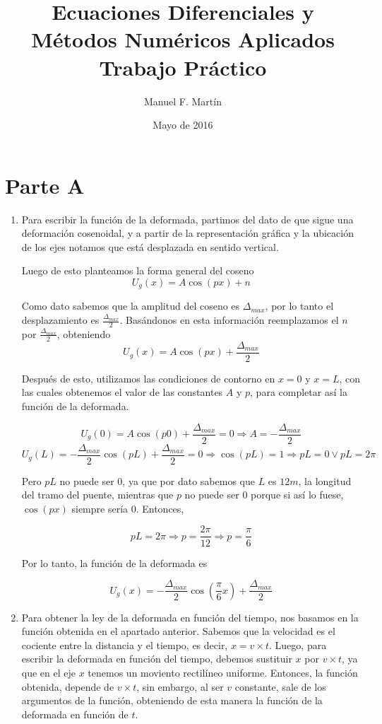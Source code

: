 \documentclass[10pt]{article}
\begin{document}
\date{Mayo de 2016}
\title{Ecuaciones Diferenciales y\\Métodos Numéricos Aplicados\\Trabajo Práctico}
\author{Manuel F. Martín}

\maketitle


\section*{Parte A}

\begin{enumerate}
 
 \item Para escribir la función de la deformada, partimos del dato de que sigue una deformación cosenoidal,
y a partir de la representación gráfica y la ubicación de los ejes notamos que está desplazada en sentido vertical.

Luego de esto planteamos la forma general del coseno \[U_g(x) = A \cos (px) + n\]

Como dato sabemos que la amplitud del coseno es
$\Delta_{max}$, por lo tanto el desplazamiento es $\frac{\Delta_{max}}{2}$. Basándonos en esta información reemplazamos el $n$ por
$\frac{\Delta_{max}}{2}$, obteniendo \[U_g(x) = A \cos (px) + \frac{\Delta_{max}}{2}\]

Después de esto, utilizamos las condiciones de contorno en $x = 0$ y $ x = L$, con las cuales obtenemos el valor de las constantes
$A$ y $p$, para completar así la función de la deformada.

\[U_g(0) = A \cos (p0) + \frac{\Delta_{max}}{2} = 0 \Rightarrow A = -\frac{\Delta_{max}}{2}\]
\[U_g(L) = -\frac{\Delta_{max}}{2} \cos (pL) + \frac{\Delta_{max}}{2} = 0 \Rightarrow \cos (pL) = 1 \Rightarrow pL = 0 \vee pL = 2\pi\]

Pero $pL$ no puede ser $0$, ya que por dato sabemos que $L$ es $12m$, la longitud del tramo del puente,
mientras que $p$ no puede ser $0$ porque si así lo fuese, $\cos(px)$ siempre sería $0$. Entonces,

\[ pL = 2\pi \Rightarrow p = \frac{2\pi}{12} \Rightarrow p = \frac{\pi}{6} \]

Por lo tanto, la función de la deformada es 

\[U_g(x) = -\frac{\Delta_{max}}{2}  \cos (\frac{\pi}{6}x) + \frac{\Delta_{max}}{2} \]

 \item Para obtener la ley de la deformada en función del tiempo, nos basamos en la función obtenida en el apartado anterior.
Sabemos que la velocidad es el cociente entre la distancia y el tiempo, es decir, $x = v \times t$. Luego, para escribir la deformada
en función del tiempo, debemos sustituir $x$ por $v \times t$, ya que en el eje $x$ tenemos un moviento rectilíneo uniforme.
Entonces, la función obtenida, depende de $v \times t$, sin embargo, al ser $v$ constante, sale de los argumentos de la función,
obteniendo de esta manera la función de la deformada en función de $t$.


\end{enumerate}
\end{document}
